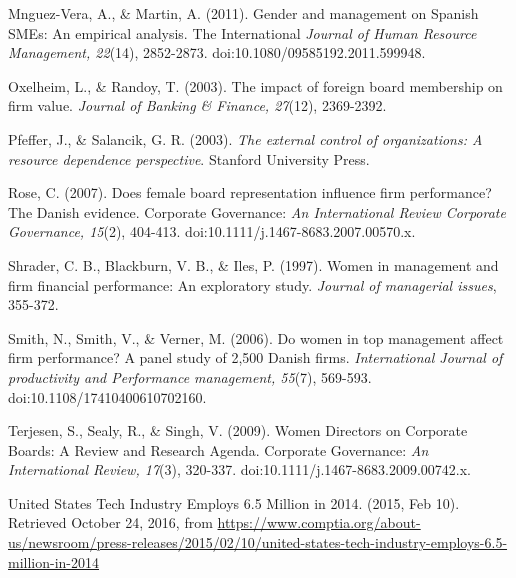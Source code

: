 \begin{thebibliography}{99\kern\bibindent}
\begin{singlespace}
Mnguez-Vera, A., \& Martin, A. (2011). Gender and management on Spanish SMEs: An empirical analysis. The International \emph{Journal of Human Resource Management, 22}(14), 2852-2873. doi:10.1080/09585192.2011.599948.
\end{singlespace}

\begin{singlespace}
Oxelheim, L., \& Randoy, T. (2003). The impact of foreign board membership on firm value. \emph{Journal of Banking \& Finance, 27}(12), 2369-2392.
\end{singlespace}

\begin{singlespace}
Pfeffer, J., \& Salancik, G. R. (2003). \emph{The external control of organizations: A resource dependence perspective}. Stanford University Press.
\end{singlespace}

\begin{singlespace}
Rose, C. (2007). Does female board representation influence firm performance? The Danish evidence. Corporate Governance: \emph{An International Review Corporate Governance, 15}(2), 404-413. doi:10.1111/j.1467-8683.2007.00570.x.
\end{singlespace}

\begin{singlespace}
Shrader, C. B., Blackburn, V. B., \& Iles, P. (1997). Women in management and firm financial performance: An exploratory study. \emph{Journal of managerial issues}, 355-372.
\end{singlespace}

\begin{singlespace}
Smith, N., Smith, V., \& Verner, M. (2006). Do women in top management affect firm performance? A panel study of 2,500 Danish firms. \emph{International Journal of productivity and Performance management, 55}(7), 569-593. doi:10.1108/17410400610702160.
\end{singlespace}

\begin{singlespace}
Terjesen, S., Sealy, R., \& Singh, V. (2009). Women Directors on Corporate Boards: A Review and Research Agenda. Corporate Governance: \emph{An International Review, 17}(3), 320-337. doi:10.1111/j.1467-8683.2009.00742.x.
\end{singlespace}

\begin{singlespace}
United States Tech Industry Employs 6.5 Million in 2014. (2015, Feb 10). Retrieved October 24, 2016, from 
\url{https://www.comptia.org/about-us/newsroom/press-releases/2015/02/10/united-states-tech-industry-employs-6.5-million-in-2014
}
\end{singlespace}


\end{thebibliography}
